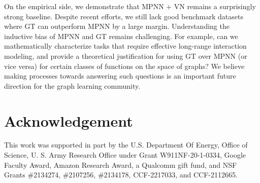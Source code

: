 \documentclass[nohyperref]{article}
\theoremstyle{plain}
\theoremstyle{definition}
\theoremstyle{remark}
\begin{document}
\begin{table}
\label{tab:sst}
\caption{\label{tab:climate} Results of SST prediction.} \begin{center}
\end{center}
\end{table}
On the empirical side, we demonstrate that MPNN + VN remains a surprisingly strong baseline. Despite recent efforts, we still lack good benchmark datasets where GT can outperform MPNN by a large margin. Understanding the inductive bias of MPNN and GT remains challenging. For example, can we mathematically characterize tasks that require effective long-range interaction modeling, and provide a theoretical justification for using GT over MPNN (or vice versa) for certain classes of functions on the space of graphs? We believe making processes towards answering such questions is an important future direction for the graph learning community.    

\section*{Acknowledgement}
This work was supported in part by the U.S. Department Of Energy, Office of Science, U. S. Army Research Office under Grant W911NF-20-1-0334, Google Faculty Award, Amazon Research Award, a Qualcomm gift fund, and NSF Grants \#2134274, \#2107256, \#2134178, CCF-2217033, and CCF-2112665.






\newpage
\onecolumn
\appendix
\end{document}
